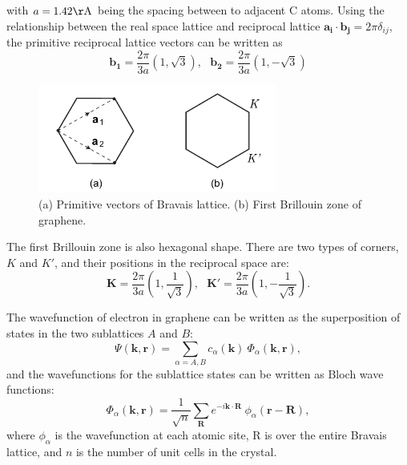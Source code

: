 \documentclass[pdflatex, sectionletters, 12pt]{pittetd}    %
\begin{document}
with $a = 1.42\mathrm{\AA}$ being the spacing between to adjacent C atoms. Using the relationship between the real space lattice and reciprocal lattice $\mathbf{a_i}\cdot\mathbf{b_j} = 2\pi\delta_{ij}$, the primitive reciprocal lattice vectors can be written as 
$$\mathbf{b_1} = \frac{2\pi}{3a}\left(1, \sqrt{3}\right), \ \ \ \mathbf{b_2} = \frac{2\pi}{3a}\left(1, -\sqrt{3}\right)$$

\begin{figure}[h!]
	\centering
	\includegraphics[width=0.7\textwidth]{Drawing/Bravais.pdf}
	\caption{(a) Primitive vectors of Bravais lattice. (b) First Brillouin zone of graphene.}
	\label{FIG:Bravais}
\end{figure}

The first Brillouin zone is also hexagonal shape. There are two types of corners, $K$ and $K'$, and their positions in the reciprocal space are:
$$\mathbf{K} = \frac{2\pi}{3a}\left(1, \frac{1}{\sqrt{3}}\right), \ \ \ \mathbf{K'} =  \frac{2\pi}{3a}\left(1, -\frac{1}{\sqrt{3}}\right).$$

The wavefunction of electron in graphene can be written as the superposition of states in the two sublattices $A$ and $B$:
$$\Psi(\mathbf{k}, \mathbf{r}) = \sum_{\alpha = A, B}c_{\alpha}(\mathbf{k}) \ \Phi_{\alpha}(\mathbf{k}, \mathbf{r}),$$
and the wavefunctions for the sublattice states can be written as Bloch wave functions:
$$\Phi_{\alpha}(\mathbf{k}, \mathbf{r}) = \frac{1}{\sqrt{n}}\sum_\mathbf{R} e^{-i \mathbf{k} \cdot \mathbf{R}} \ \phi_{\alpha}(\mathbf{r} - \mathbf{R}),$$
where $\phi_{\alpha}$ is the wavefunction at each atomic site, R is over the entire Bravais lattice, and $n$ is the number of unit cells in the crystal. 
\end{document}
